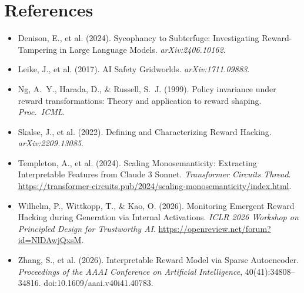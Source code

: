 \documentclass[11pt]{article}
\begin{document}
\section*{References}

\begin{itemize}[nosep, leftmargin=*]
  \item Denison, E., et al. (2024). Sycophancy to Subterfuge: Investigating Reward-Tampering in Large Language Models. \textit{arXiv:2406.10162}.
  \item Leike, J., et al. (2017). AI Safety Gridworlds. \textit{arXiv:1711.09883}.
  \item Ng, A.~Y., Harada, D., \& Russell, S.~J. (1999). Policy invariance under reward transformations: Theory and application to reward shaping. \textit{Proc.\ ICML}.
  \item Skalse, J., et al. (2022). Defining and Characterizing Reward Hacking. \textit{arXiv:2209.13085}.
  \item Templeton, A., et al. (2024). Scaling Monosemanticity: Extracting Interpretable Features from Claude 3 Sonnet. \textit{Transformer Circuits Thread}. \url{https://transformer-circuits.pub/2024/scaling-monosemanticity/index.html}.
  \item Wilhelm, P., Wittkopp, T., \& Kao, O. (2026). Monitoring Emergent Reward Hacking during Generation via Internal Activations. \textit{ICLR 2026 Workshop on Principled Design for Trustworthy AI}. \url{https://openreview.net/forum?id=NlDAwjQxsM}.
  \item Zhang, S., et al. (2026). Interpretable Reward Model via Sparse Autoencoder. \textit{Proceedings of the AAAI Conference on Artificial Intelligence}, 40(41):34808--34816. doi:10.1609/aaai.v40i41.40783.
\end{itemize}
\end{document}
